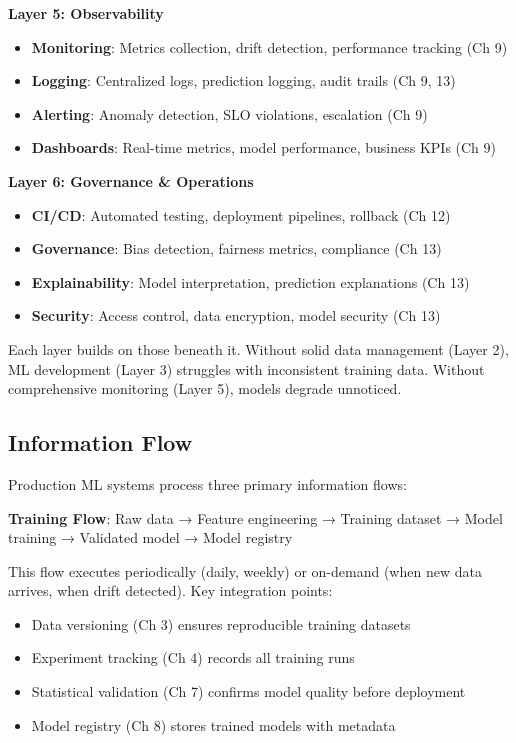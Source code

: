 \textbf{Layer 5: Observability}
\begin{itemize}
    \item \textbf{Monitoring}: Metrics collection, drift detection, performance tracking (Ch 9)
    \item \textbf{Logging}: Centralized logs, prediction logging, audit trails (Ch 9, 13)
    \item \textbf{Alerting}: Anomaly detection, SLO violations, escalation (Ch 9)
    \item \textbf{Dashboards}: Real-time metrics, model performance, business KPIs (Ch 9)
\end{itemize}

\textbf{Layer 6: Governance \& Operations}
\begin{itemize}
    \item \textbf{CI/CD}: Automated testing, deployment pipelines, rollback (Ch 12)
    \item \textbf{Governance}: Bias detection, fairness metrics, compliance (Ch 13)
    \item \textbf{Explainability}: Model interpretation, prediction explanations (Ch 13)
    \item \textbf{Security}: Access control, data encryption, model security (Ch 13)
\end{itemize}

Each layer builds on those beneath it. Without solid data management (Layer 2), ML development (Layer 3) struggles with inconsistent training data. Without comprehensive monitoring (Layer 5), models degrade unnoticed.

\subsection{Information Flow}

Production ML systems process three primary information flows:

\textbf{Training Flow}: Raw data → Feature engineering → Training dataset → Model training → Validated model → Model registry

This flow executes periodically (daily, weekly) or on-demand (when new data arrives, when drift detected). Key integration points:
\begin{itemize}
    \item Data versioning (Ch 3) ensures reproducible training datasets
    \item Experiment tracking (Ch 4) records all training runs
    \item Statistical validation (Ch 7) confirms model quality before deployment
    \item Model registry (Ch 8) stores trained models with metadata
\end{itemize}

